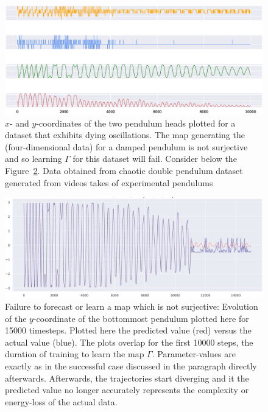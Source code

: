 \begin{figure}[ht]
  \includegraphics[scale=0.4]{Graphs/_dp_dying.eps}
  \centering
\caption{$x$- and $y$-coordinates of the two pendulum heads plotted for a dataset that exhibits dying oscillations. The map generating the (four-dimensional data) for a damped pendulum is not surjective and so learning $\Gamma$ for this dataset will fail. Consider below the Figure~\ref{fig:dp_notsurjective}. Data obtained from chaotic double pendulum dataset generated from videos takes of experimental pendulums~\cite{asseman2018learning}}
\label{fig:damped_pendulum}
\end{figure}

\begin{figure}[ht]
  \includegraphics[scale=0.3]{Graphs/_dpfail_nonsurj.eps}
  \centering
\caption{Failure to forecast or learn a map which is not surjective: Evolution of the $y$-coordinate of the bottommost pendulum plotted here for 15000 timesteps. Plotted here the predicted value (red) versus the actual value (blue). The plots overlap for the first 10000 steps, the duration of training to learn the map $\Gamma$. Parameter-values are exactly as in the successful case discussed in the paragraph directly afterwards. Afterwards, the trajectories start diverging and it the predicted value no longer accurately represents the complexity or energy-loss of the actual data. }
\label{fig:dp_notsurjective}
\end{figure}


